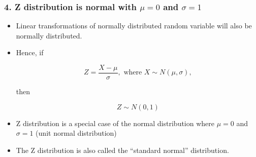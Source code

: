 \documentclass[slidestop,compress,mathserif,12pt,t,professionalfonts,xcolor=table]{beamer}
\begin{document}
\begin{frame}
\frametitle{4. Z distribution is normal with $\mu = 0$ and $\sigma = 1$}

\begin{itemize}

\item Linear transformations of normally distributed random variable will also be normally distributed.

\item Hence, if

\[ Z = \frac{X - \mu}{\sigma}, \text{ where } X \sim N(\mu, \sigma), \]

then

\[ Z \sim N(0,1) \]

\item Z distribution is a special case of the normal distribution where $\mu = 0$ and $\sigma = 1$ (unit normal distribution)

\item The Z distribution is also called the ``standard normal'' distribution.

\end{itemize}


\end{frame}

\end{document}

